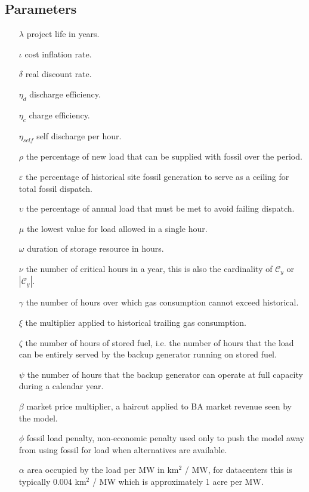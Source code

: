 \documentclass[9pt, oneside]{article}
\numberwithin{equation}{subsubsection}
\begin{document}
\subsection{Parameters}\label{subsec:parameters}
\begin{multicols}{2}
	{\small
		\begin{itemize}
			\item[$\lambda$] project life in years.
			\item[$\iota$] cost inflation rate.
			\item[$\delta$] real discount rate.
			\item[$\eta_d$] discharge efficiency.
			\item[$\eta_c$] charge efficiency.
			\item[$\eta_{self}$] self discharge per hour.
			\item[$\rho$] the percentage of new load that can be supplied with fossil over the period.
			\item[$\varepsilon$] the percentage of historical site fossil generation to serve as a ceiling for total fossil dispatch.
			\item[$\upsilon$] the percentage of annual load that must be met to avoid failing dispatch.
			\item[$\mu$] the lowest value for load allowed in a single hour.
			\item[$\omega$] duration of storage resource in hours.
			\item[$\nu$] the number of critical hours in a year, this is also the cardinality of $\mathcal{C}_y$ or $|\mathcal{C}_y|$.
			\item[$\gamma$] the number of hours over which gas consumption cannot exceed historical.
			\item[$\xi$] the multiplier applied to historical trailing gas consumption.
			\item[$\zeta$] the number of hours of stored fuel, i.e. the number of hours that the load can be entirely served by the backup generator running on stored fuel.
			\item[$\psi$] the number of hours that the backup generator can operate at full capacity during a calendar year.
			\item[$\beta$] market price multiplier, a haircut applied to BA market revenue seen by the model.
			\item[$\phi$] fossil load penalty, non-economic penalty used only to push the model away from using fossil for load when alternatives are available.
			\item[$\alpha$] area occupied by the load per MW in km$^2$ / MW, for datacenters this is typically 0.004 km$^2$ / MW which is approximately 1 acre per MW.
		\end{itemize}
	}
\end{multicols}
\end{document}
